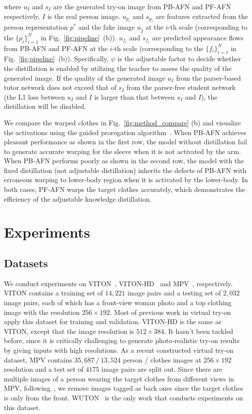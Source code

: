 \documentclass[final]{cvpr}
\begin{document}
where ${u}_{I}$ and ${s}_{I}$ are the generated try-on image from PB-AFN and PF-AFN respectively, $I$ is the real person image.
$u_{p_i}$ and $s_{p_i}$ are features extracted from the person representation $p^*$ and the fake image ${u}_{\widetilde{I}}$ at the $i$-th scale (\ie corresponding to the $\{p_i\}_{i=1}^N$ in Fig.~\ref{fig:pipeline}~(b)).
$u_{f_i}$ and $s_{f_i}$ are predicted appearance flows from PB-AFN and PF-AFN at the $i$-th scale (\ie corresponding to the $\{f_i\}_{i=1}^N$ in Fig.~\ref{fig:pipeline}~(b)).
Specifically, ${\psi}$ is the adjustable factor to decide whether the distillation is enabled by utilizing the teacher to assess the quality of the generated image.
If the quality of the generated image $u_I$ from the parser-based tutor network does not exceed that of $s_I$ from the parser-free student network (\ie the L1 loss between $u_I$ and $I$ is larger than that between $s_I$ and $I$), the distillation will be disabled. 
	
We compare the warped clothes in Fig.~\ref{fig:method_compare} (b) and visualize the activations using the guided prorogation algorithm~\cite{guided}.
When PB-AFN achieves pleasant performance as shown in the first row, the model without distillation fail to generate accurate warping for the sleeve when it is not activated by the arm.
When PB-AFN performs poorly as shown in the second row, the model with the fixed distillation (not adjustable distillation) inherits the defects of PB-AFN with erroneous warping to lower-body region when it is activated by the lower-body.
In both cases, PF-AFN warps the target clothes accurately, which demonstrates the efficiency of the adjustable knowledge distillation. 
	
\section{Experiments}
	\subsection{Datasets}
	We conduct experiments on VITON~\cite{viton}, VITON-HD~\cite{viton} and MPV~\cite{MPV}, respectively.
VITON contains a training set of $14,221$ image pairs and a testing set of $2,032$ image pairs, each of which has a front-view woman photo and a top clothing image with the resolution $256 \times 192$.
Most of previous work in virtual try-on apply this dataset for training and validation.
VITON-HD is the same as VITON, except that the image resolution is $512 \times 384$.
It hasn't been tackled before, since it is critically challenging to generate photo-realistic try-on results by giving inputs with high resolutions.
As a recent constructed virtual try-on dataset, MPV contains $35,687~/~13,524$ person / clothes images at $256 \times 192 $ resolution and a test set of $4175$ image pairs are split out.
Since there are multiple images of a person wearing the target clothes from different views in MPV, following~\cite{parser_free}, we remove images tagged as back ones since the target clothes is only from the front.
WUTON~\cite{parser_free} is the only work that conducts experiments on this dataset.
	
\end{document}
